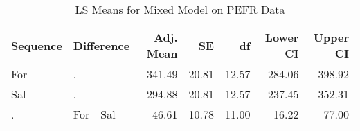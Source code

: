 \begin{table}

\caption{\label{tab:pefrDataLSMeans}LS Means for Mixed Model on PEFR Data}
\centering
\begin{tabular}[t]{l>{}l|rrrrr}
\toprule
Sequence & Difference & Adj. Mean & SE & df & Lower CI & Upper CI\\
\midrule
For & . & 341.49 & 20.81 & 12.57 & 284.06 & 398.92\\
Sal & . & 294.88 & 20.81 & 12.57 & 237.45 & 352.31\\
. & For - Sal & 46.61 & 10.78 & 11.00 & 16.22 & 77.00\\
\bottomrule
\end{tabular}
\end{table}
